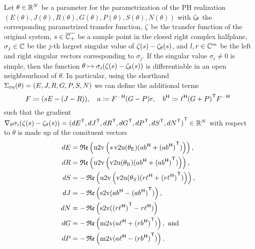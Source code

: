\begin{theorem}\label{lem:inner-sobmor-gradient}
    Let $\theta \in \mathbb{R}^{N}$ be a parameter for the parametrization of the \ac{PH} realization $(E(\theta), J(\theta), R(\theta), G(\theta), P(\theta), S(\theta), N(\theta))$ with $\zeta_\theta$ the corresponding parametrized transfer function, $\zeta$ be the transfer function of the original system, $s \in \overline{\mathbb{C}_+}$ be a sample point in the closed right complex halfplane, $\sigma_j \in \mathbb{C}$ be the $j$-th largest singular value of $\zeta(s) - \zeta_\theta(s)$, and $l, r \in \mathbb{C}^m$ be the left and right singular vectors corresponding to $\sigma_j$.
    If the singular value $\sigma_i \neq 0$ is simple, then the function $\theta \mapsto \sigma_i(\zeta(s) - \zeta_\theta(s))$ is differentiable in an open neighbourhood of $\theta$.
    In particular, using the shorthand $\Sigma_{\textnormal{\scshape ph}}(\theta) = (E, J, R, G, P, S, N)$ we can define the additional terms
    \begin{equation}\label{eq:inner-sobmor-gradient-helpers}
        F \coloneqq (s E - (J - R)),\quad a \coloneqq F\inv (G - P) r,\quad b\herm \coloneqq \ell\herm {(G + P)}\trans F\inv
    \end{equation}
    such that the gradient $\nabla_\theta \sigma_i(\zeta(s) - \zeta_\theta(s)) = {({dE}^{\mkern1mu \mathsf{T}}, {dJ}^{\mkern1mu \mathsf{T}}, {dR}^{\mkern1mu \mathsf{T}}, {dG}^{\mkern1mu \mathsf{T}}, {dP}^{\mkern1mu \mathsf{T}}, {dS}^{\mkern1mu \mathsf{T}}, {dN}^{\mkern1mu \mathsf{T}})}^{\mkern1mu \mathsf{T}} \in \mathbb{R}^N$ with respect to $\theta$ is made up of the consituent vectors
    \begin{equation}\label{eq:inner-sobmor-gradient-components}
        \begin{aligned}
            dE &= \re{\uppervec\left( s \vecupper(\theta_\msc{E}) (a b\herm + {(a b\herm)}\trans) \right)}, \\
            dR &= \re{\uppervec\left( \vecupper(\theta_\msc{R}) (a b\herm + {(a b\herm)}\trans) \right)}, \\
            dS &= - \re{\uppervec\left( \vecupper(\theta_S) (r \ell\herm + {(r \ell\herm)}\trans) \right)}, \\
            dJ &= - \re{\strictvec(a b\herm - {(a b\herm)}\trans)}, \\
            dN &= - \re{\strictvec({(r \ell\herm)}\trans - r \ell\herm)} \\
            dG &= - \re{\matvec(a \ell\herm + {(r b\herm)}\trans)}, \text{ and} \\
            dP &= - \re{\matvec(a \ell\herm - {(r b\herm)}\trans)}.
        \end{aligned}
    \end{equation}
\end{theorem}

